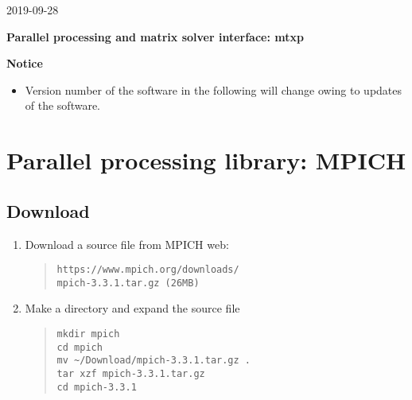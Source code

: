 \documentclass[11pt]{article}
\begin{document}
\begin{flushright}
2019-09-28
\end{flushright}

\begin{center}
{\Large \bf Parallel processing and matrix solver interface: mtxp}
\end{center}

\tableofcontents

\bigskip
\begin{center}
\textbf{Notice}
\end{center}
\begin{itemize}
\item
Version number of the software in the following will change owing to
updates of the software.
\end{itemize}
\bigskip

\section{Parallel processing library: MPICH}

\subsection{Download}

\begin{enumerate}
\item
Download a source file from MPICH web: 
\begin{quote}
\begin{verbatim}
https://www.mpich.org/downloads/
mpich-3.3.1.tar.gz (26MB)
\end{verbatim}
\end{quote}
\item
Make a directory and expand the source file
\begin{quote}
\begin{verbatim}
mkdir mpich
cd mpich
mv ~/Download/mpich-3.3.1.tar.gz .
tar xzf mpich-3.3.1.tar.gz
cd mpich-3.3.1
\end{verbatim}
\end{quote}
\end{enumerate}
\end{document}
